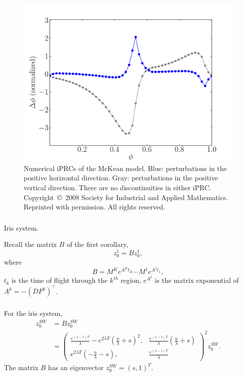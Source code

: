 \documentclass{beamer}
\renewcommand{\matrix}[2]{ \left(\begin{array}{#1} #2 \end{array}\right)}
\begin{document}
\begin{figure}[h!]
\begin{center} \includegraphics[width=.75\textwidth]{pmk_prc_fig.pdf}\end{center}
\caption[Numerical iPRCs of the McKean model]{Numerical iPRCs of the McKean model. Blue: perturbations in the positive horizontal direction. Gray: perturbations in the positive vertical direction.  There are no discontinuities in either iPRC. Copyright~\copyright ~2008 Society for Industrial and Applied Mathematics.  Reprinted with permission.  All rights reserved.}
\label{fig:pmk_iprc}\end{figure}


\begin{frame}
\frametitle{\insertsection}
\framesubtitle{\insertsubsection}
Iris system.

Recall the matrix $B$ of the first corollary,
 \begin{equation}
z^1_0=B z^1_0,
\end{equation}
where
\begin{equation}
B=M^{K}e^{A^{K}t_K}\cdots M^1e^{A^1 t_1},
\end{equation}
$t_k$ is the time of flight through the $k^{th}$ region, $e^{A^{k}}$ is the matrix exponential of $A^k = -\left(DF^k\right)^\intercal$.  

\end{frame}

\begin{frame}
 \frametitle{\insertsection}
\framesubtitle{\insertsubsection}
For the iris system, 
\begin{equation}
\begin{split}
 z_0^{SW} &= B z_0^{SW}\\
 &= \matrix{cc}{\frac{e^{(\lambda-1)T}}{\lambda} - e^{2\lambda T} \left ( \frac{u}{\lambda} + s \right )^2, & \frac{e^{(\lambda-1)T}}{\lambda}\left ( \frac{u}{\lambda} + s \right )\\
 e^{2\lambda T} \left ( -\frac{u}{\lambda} -s \right), & \frac{e^{(\lambda -1)T}}{\lambda}}^2 z_0^{SW}.
 \end{split}
\end{equation}
The matrix $B$ has an eigenvector $z_0^{SW} = (s,1)^T$.
\end{frame}
\end{document}
